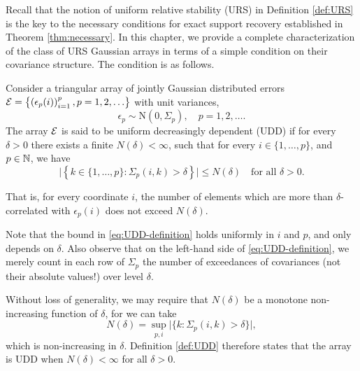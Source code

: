 
Recall that the notion of uniform relative stability (URS) in Definition \ref{def:URS} is the key to the necessary conditions for exact support recovery 
established in Theorem \ref{thm:necessary}.
In this chapter, we provide a complete characterization of the class of URS Gaussian arrays in terms of a simple condition on their covariance structure.
The condition is as follows.



\begin{definition} \label{def:UDD}
Consider a triangular array of jointly Gaussian distributed errors 
${\cal E} = \left\{\left(\epsilon_p(i)\right)_{i=1}^p, p = 1,2,\ldots\right\}$ 
with unit variances,
$$
\epsilon_p \sim \text{N}(0, \Sigma_p), \quad p=1,2,\ldots.
$$
The array ${\cal E}$ is said to be uniform decreasingly dependent (UDD) if 
for every $\delta>0$ there exists a finite $N(\delta)<\infty$, such that for every $i\in\{1,\ldots,p\}$, and $p\in\mathbb N$, we have
\begin{equation} \label{eq:UDD-definition}
    \Big|\left\{k\in\{1,\ldots,p\}:\Sigma_p(i,k)>\delta\right\}\Big| \le N(\delta)\quad \text{for all  } \delta>0.
\end{equation}
\end{definition}
That is, for every coordinate $i$, the number of elements which are more than $\delta$-correlated with $\epsilon_p(i)$ does not exceed $N(\delta)$. 

Note that the bound in \eqref{eq:UDD-definition} holds uniformly in $i$ and $p$, and only depends on $\delta$.
Also observe that on the left-hand side of \eqref{eq:UDD-definition}, we merely count in each row of $\Sigma_p$ the number of exceedances of covariances (not their absolute values!) over level $\delta$.

\begin{remark} \label{rmk:choice-of-N(delta)}
Without loss of generality, we may require that $N(\delta)$ be a monotone non-increasing function of $\delta$, for we can take
$$
N(\delta) = \sup_{p,i} \Big|\{k:\Sigma_p(i,k)>\delta\}\Big|,
$$
which is non-increasing in $\delta$.
Definition \ref{def:UDD} therefore states that the array is UDD when $N(\delta)<\infty$ for all $\delta>0$.
\end{remark}


